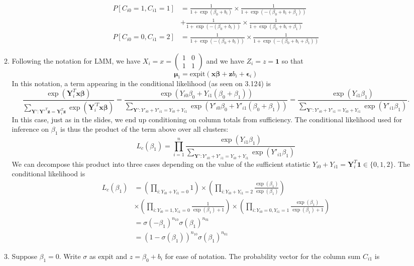 \documentclass[11pt]{article}
\begin{document}
\begin{enumerate}
\begin{enumerate}
\begin{align*}
				P[C_{i0}=1, C_{i1}=1] &= \frac{1}{1+\exp(\beta_0 + b_i)}\times\frac{1}{1+\exp(-(\beta_0 + b_i+\beta_1))} \\				
				&+ \frac{1}{1+\exp(-(\beta_0 + b_i))}\times\frac{1}{1+\exp(\beta_0 + b_i+\beta_1)} \\
				P[C_{i0}=0, C_{i1}=2] &= \frac{1}{1+\exp(-(\beta_0 + b_i))}\times\frac{1}{1+\exp(-(\beta_0 + b_i+\beta_1))}
			\end{align*}
			\item Following the notation for LMM, we have $X_i = x = \begin{pmatrix}
				1 & 0 \\ 1 & 1
			\end{pmatrix}$ and we have $Z_i = z = \bm{1}$ so that
			\[
				\bm{\mu}_i = \mathrm{expit}(\bm{x}\bm{\beta} + \bm{z}b_i + \bm{\epsilon}_i)
			\]
			In this notation, a term appearing in the conditional likelihood (as seen on 3.124) is
			\[
				\frac{\exp(\bm{Y}_i^T\bm{x}\bm{\beta})}{\sum_{\bm{Y}':\bm{Y}'^T\bm{z} = \bm{Y}_i^T\bm{z}}\exp(\bm{Y}_i^{'T}\bm{x}\bm{\beta})} = \frac{\exp(Y_{i0}\beta_0 + Y_{i1}(\beta_0+\beta_1))}{\sum_{\bm{Y}':Y'_{i0}+Y'_{i1}=Y_{i0}+Y_{i1}}\exp(Y'_{i0}\beta_0 + Y'_{i1}(\beta_0+\beta_1))} = \frac{\exp(Y_{i1}\beta_1)}{\sum_{\bm{Y}':Y'_{i0}+Y'_{i1}=Y_{i0}+Y_{i1}} \exp(Y'_{i1}\beta_1)}.
			\]
			In this case, just as in the slides, we end up conditioning on column totals from sufficiency. The conditional likelihood used for inference on $\beta_1$ is thus the product of the term above over all clusters:
			\[
				L_c(\beta_1) = \prod_{i=1}^n \frac{\exp(Y_{i1}\beta_1)}{\sum_{\bm{Y}':Y'_{i0}+Y'_{i1}=Y_{i0}+Y_{i1}} \exp(Y'_{i1}\beta_1)}
			\]
			We can decompose this product into three cases depending on the value of the sufficient statistic $Y_{i0}+Y_{i1}=\bm{Y}_i^T\bm{1} \in \{0,1,2\}$.
			The conditional likelihood is
			\begin{align*}
				L_c(\beta_1) &= \left(\prod_{i:Y_{i0}+Y_{i1}=0}1\right) \times \left(\prod_{i:Y_{i0}+Y_{i1}=2}\frac{\exp(\beta_1)}{\exp(\beta_1)}\right) \\
				&\times\left(\prod_{i:Y_{i0}=1,Y_{i1}=0}\frac{1}{\exp(\beta_1)+1}\right)\times\left(\prod_{i:Y_{i0}=0,Y_{i1}=1}\frac{\exp(\beta_1)}{\exp(\beta_1)+1}\right) \\
				&= \sigma(-\beta_1)^{n_{10}}\sigma(\beta_1)^{n_{01}} \\
				&= (1-\sigma(\beta_1))^{n_{10}}\sigma(\beta_1)^{n_{01}}
			\end{align*}
			\item Suppose $\beta_1=0$. Write $\sigma$ as $\mathrm{expit}$ and $z=\beta_0+b_i$ for ease of notation. The probability vector for the column sum $C_{i1}$ is

\end{enumerate}
\end{enumerate}
\end{document}
